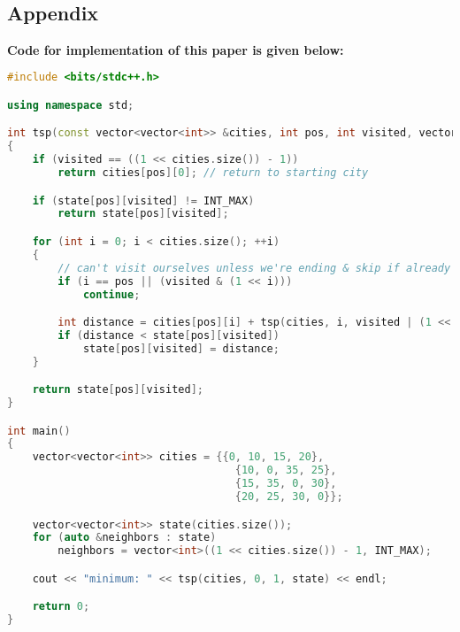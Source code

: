 \documentclass[conference]{IEEEtran}
\begin{document}
\color{black}
\
\begin{titlepage}
    \begin{center}
        \Huge
        \section*{Appendix}
        \end{center}
         \textbf{Code for implementation of this paper is given below:}
\begin{lstlisting}[language=C++,caption=Code for this paper]
#include <bits/stdc++.h>

using namespace std;

int tsp(const vector<vector<int>> &cities, int pos, int visited, vector<vector<int>> &state)
{
    if (visited == ((1 << cities.size()) - 1))
        return cities[pos][0]; // return to starting city

    if (state[pos][visited] != INT_MAX)
        return state[pos][visited];

    for (int i = 0; i < cities.size(); ++i)
    {
        // can't visit ourselves unless we're ending & skip if already visited
        if (i == pos || (visited & (1 << i)))
            continue;

        int distance = cities[pos][i] + tsp(cities, i, visited | (1 << i), state);
        if (distance < state[pos][visited])
            state[pos][visited] = distance;
    }

    return state[pos][visited];
}

int main()
{
    vector<vector<int>> cities = {{0, 10, 15, 20},
                                    {10, 0, 35, 25},
                                    {15, 35, 0, 30},
                                    {20, 25, 30, 0}};

    vector<vector<int>> state(cities.size());
    for (auto &neighbors : state)
        neighbors = vector<int>((1 << cities.size()) - 1, INT_MAX);

    cout << "minimum: " << tsp(cities, 0, 1, state) << endl;

    return 0;
}

   
\end{lstlisting}
\end{titlepage}
\end{document}
